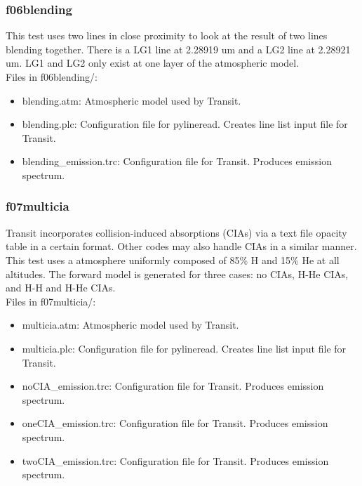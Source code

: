 \documentclass[letterpaper, 12pt]{article}
\begin{document}
\subsubsection{f06blending}
\label{sec:blending}
This test uses two lines in close proximity to look at the 
result of two lines blending together. There is a LG1 line at 2.28919 um 
and a LG2 line at 2.28921 um. LG1 and LG2 only exist at one layer of the 
atmospheric model.\\

Files in f06blending/:
\begin{itemize} \itemsep0pt
  \item blending.atm: Atmospheric model used by Transit.
  \item blending.plc: Configuration file for pylineread. Creates 
        line list input file for Transit.
  \item blending{\_}emission.trc: Configuration file for Transit. Produces 
        emission spectrum.
\end{itemize}

\subsubsection{f07multicia}
\label{sec:multicia}
Transit incorporates collision-induced absorptions (CIAs) via a text file 
opacity table in a certain format. Other codes may also handle CIAs in a 
similar manner. This test uses a atmosphere uniformly composed of 85\% H 
and 15\% He at all altitudes. The forward model is generated for three cases: 
no CIAs, H-He CIAs, and H-H and H-He CIAs.\\

Files in f07multicia/:
\begin{itemize} \itemsep0pt
  \item multicia.atm: Atmospheric model used by Transit.
  \item multicia.plc: Configuration file for pylineread. Creates 
        line list input file for Transit.
  \item noCIA{\_}emission.trc: Configuration file for Transit. Produces 
        emission spectrum.
  \item oneCIA{\_}emission.trc: Configuration file for Transit. Produces 
        emission spectrum.
  \item twoCIA{\_}emission.trc: Configuration file for Transit. Produces 
        emission spectrum.
\end{itemize}
\end{document}
